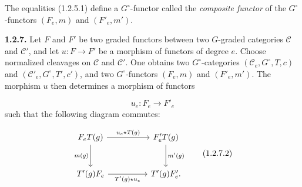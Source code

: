 The equalities (1.2.5.1) define a $G^\circ$-functor called the
\emph{composite functor} of the $G^\circ$-functors $(F_e,m)$ and
$(F'_e,m')$.

\noindent\textbf{1.2.7.}\quad
Let $F$ and $F'$ be two graded functors between two $G$-graded
categories $\mathcal C$ and $\mathcal C'$, and let
$u\colon F\to F'$ be a morphism of functors of degree $e$. Choose
normalized cleavages on $\mathcal C$ and $\mathcal C'$. One obtains
two $G^\circ$-categories $(\mathcal C_e,G^\circ,T,c)$ and
$(\mathcal C'_e,G^\circ,T',c')$, and two $G^\circ$-functors
$(F_e,m)$ and $(F'_e,m')$. The morphism $u$ then determines a morphism
of functors

\begin{equation}
  u_e\colon F_e\longrightarrow F'_e
  \tag{1.2.7.1}
\end{equation}
such that the following diagram commutes:

\begin{equation}
\begin{tikzcd}[column sep=huge,row sep=large]
F_eT(g)
  \arrow[r,"u_e\star T(g)"]
  \arrow[d,"m(g)",swap]
&
F_e^{\prime}T(g)
  \arrow[d,"m^{\prime}(g)"]
\\
T^{\prime}(g)F_e
  \arrow[r,"T^{\prime}(g)\star u_e",swap]
&
T^{\prime}(g)F_e^{\prime}\mathpunct{.}
\end{tikzcd}
\tag{1.2.7.2}
\end{equation}
